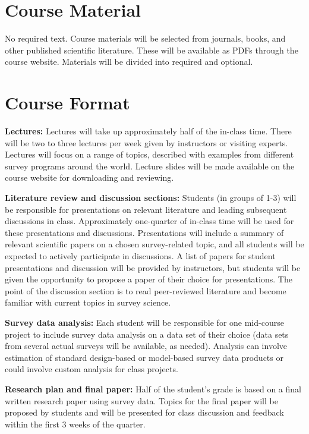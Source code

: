 \documentclass[
  letterpaper,
  oneside,
  open=any]{scrbook}
\begin{document}
\section{Course Material}\label{course-material}

No required text. Course materials will be selected from journals,
books, and other published scientific literature. These will be
available as PDFs through the course website. Materials will be divided
into required and optional.

\section{Course Format}\label{course-format}

\textbf{Lectures:} Lectures will take up approximately half of the
in-class time. There will be two to three lectures per week given by
instructors or visiting experts. Lectures will focus on a range of
topics, described with examples from different survey programs around
the world. Lecture slides will be made available on the course website
for downloading and reviewing.

\textbf{Literature review and discussion sections:} Students (in groups
of 1-3) will be responsible for presentations on relevant literature and
leading subsequent discussions in class. Approximately one-quarter of
in-class time will be used for these presentations and discussions.
Presentations will include a summary of relevant scientific papers on a
chosen survey-related topic, and all students will be expected to
actively participate in discussions. A list of papers for student
presentations and discussion will be provided by instructors, but
students will be given the opportunity to propose a paper of their
choice for presentations. The point of the discussion section is to read
peer-reviewed literature and become familiar with current topics in
survey science.

\textbf{Survey data analysis:} Each student will be responsible for one
mid-course project to include survey data analysis on a data set of
their choice (data sets from several actual surveys will be available,
as needed). Analysis can involve estimation of standard design-based or
model-based survey data products or could involve custom analysis for
class projects.

\textbf{Research plan and final paper:} Half of the student's grade is
based on a final written research paper using survey data. Topics for
the final paper will be proposed by students and will be presented for
class discussion and feedback within the first 3 weeks of the quarter.
\end{document}
